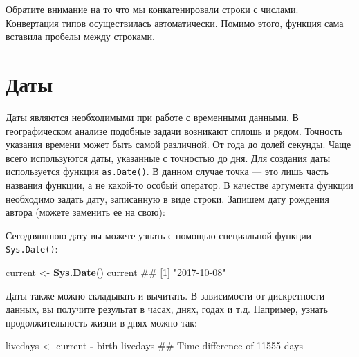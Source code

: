 \documentclass[]{book}
\newenvironment{Shaded}{\begin{snugshade}}{\end{snugshade}}
\newcommand{\KeywordTok}[1]{\textcolor[rgb]{0.13,0.29,0.53}{\textbf{#1}}}
\newcommand{\StringTok}[1]{\textcolor[rgb]{0.31,0.60,0.02}{#1}}
\newcommand{\OperatorTok}[1]{\textcolor[rgb]{0.81,0.36,0.00}{\textbf{#1}}}
\newcommand{\NormalTok}[1]{#1}
\begin{document}
Обратите внимание на то что мы конкатенировали строки с числами.
Конвертация типов осуществилась автоматически. Помимо этого, функция
сама вставила пробелы между строками.

\section{Даты}\label{dates}

Даты являются необходимыми при работе с временными данными. В
географическом анализе подобные задачи возникают сплошь и рядом.
Точность указания времени может быть самой различной. От года до долей
секунды. Чаще всего используются даты, указанные с точностью до дня. Для
создания даты используется функция \texttt{as.Date()}. В данном случае
точка --- это лишь часть названия функции, а не какой-то особый
оператор. В качестве аргумента функции необходимо задать дату,
записанную в виде строки. Запишем дату рождения автора (можете заменить
ее на свою):

\begin{Shaded}
\end{Shaded}

Сегодняшнюю дату вы можете узнать с помощью специальной функции
\texttt{Sys.Date()}:

\begin{Shaded}
\begin{Highlighting}[]
\NormalTok{current <-}\StringTok{ }\KeywordTok{Sys.Date}\NormalTok{()}
\NormalTok{current}
\NormalTok{## [1] "2017-10-08"}
\end{Highlighting}
\end{Shaded}

Даты также можно складывать и вычитать. В зависимости от дискретности
данных, вы получите результат в часах, днях, годах и т.д. Например,
узнать продолжительность жизни в днях можно так:

\begin{Shaded}
\begin{Highlighting}[]
\NormalTok{livedays <-}\StringTok{ }\NormalTok{current }\OperatorTok{-}\StringTok{ }\NormalTok{birth}
\NormalTok{livedays}
\NormalTok{## Time difference of 11555 days}
\end{Highlighting}
\end{Shaded}
\end{document}
